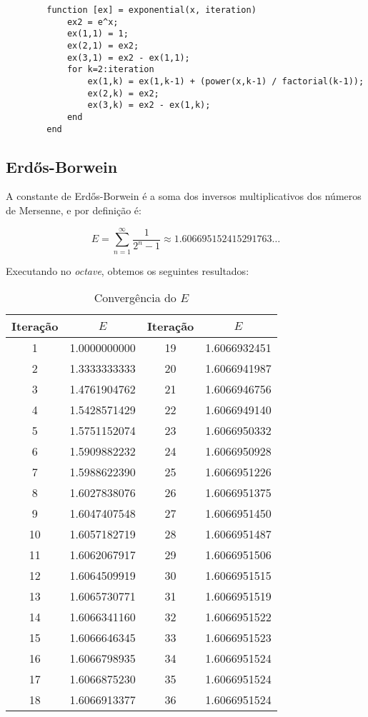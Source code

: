 		\begin{lstlisting}
		function [ex] = exponential(x, iteration)
			ex2 = e^x;
			ex(1,1) = 1;
			ex(2,1) = ex2;
			ex(3,1) = ex2 - ex(1,1);
			for k=2:iteration
				ex(1,k) = ex(1,k-1) + (power(x,k-1) / factorial(k-1));
				ex(2,k) = ex2;
				ex(3,k) = ex2 - ex(1,k);
			end
		end
		\end{lstlisting}

	\subsection{Erdős-Borwein}

		A constante de Erdős-Borwein é a soma dos inversos multiplicativos dos
		números de Mersenne, e por definição é:

		\begin{equation}
			E = \displaystyle\sum_{n=1}^{\infty} \frac{1}{2^n-1} \approx 1.606695152415291763\dots
		\end{equation}

		Executando no \emph{octave}, obtemos os seguintes resultados:

		\begin{table}[H]
			\centering
			\begin{tabular}{|c|c|c|c|}
				\hline
				Iteração & $E$ & Iteração & $E$ \\
				\hline
				1 & 1.0000000000 & 19 & 1.6066932451 \\
				\hline
				2 & 1.3333333333 & 20 & 1.6066941987 \\
				\hline
				3 & 1.4761904762 & 21 & 1.6066946756 \\
				\hline
				4 & 1.5428571429 & 22 & 1.6066949140 \\
				\hline
				5 & 1.5751152074 & 23 & 1.6066950332 \\
				\hline
				6 & 1.5909882232 & 24 & 1.6066950928 \\
				\hline
				7 & 1.5988622390 & 25 & 1.6066951226 \\
				\hline
				8 & 1.6027838076 & 26 & 1.6066951375 \\
				\hline
				9 & 1.6047407548 & 27 & 1.6066951450 \\
				\hline
				10 & 1.6057182719 & 28 & 1.6066951487 \\
				\hline
				11 & 1.6062067917 & 29 & 1.6066951506 \\
				\hline
				12 & 1.6064509919 & 30 & 1.6066951515 \\
				\hline
				13 & 1.6065730771 & 31 & 1.6066951519 \\
				\hline
				14 & 1.6066341160 & 32 & 1.6066951522 \\
				\hline
				15 & 1.6066646345 & 33 & 1.6066951523 \\
				\hline
				16 & 1.6066798935 & 34 & 1.6066951524 \\
				\hline
				17 & 1.6066875230 & 35 & 1.6066951524 \\
				\hline
				18 & 1.6066913377 & 36 & 1.6066951524 \\
				\hline
			\end{tabular}
			\label{erdos_table}
			\caption{Convergência do $E$}
		\end{table}

